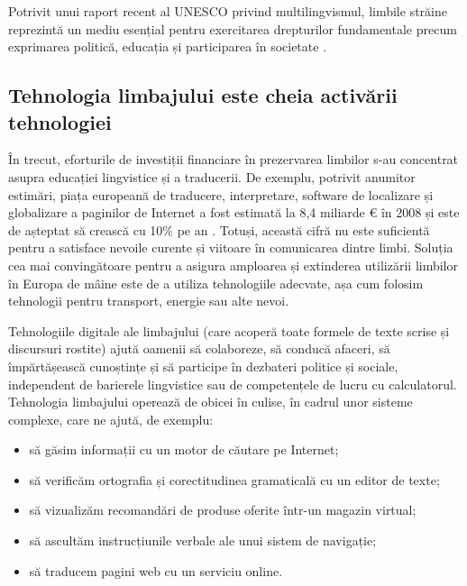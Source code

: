 \begin{multicols}{2}

Potrivit unui raport recent al UNESCO privind multilingvismul, limbile străine reprezintă un mediu esențial pentru exercitarea drepturilor fundamentale precum exprimarea politică, educația și participarea în societate \cite{Unesco1}.

\subsection{Tehnologia limbajului este cheia activării tehnologiei}

În trecut, eforturile de investiții financiare în prezervarea limbilor s-au concentrat asupra educației lingvistice și a traducerii. De exemplu, potrivit anumitor estimări, piața europeană de traducere, interpretare, software de localizare și globalizare a paginilor de Internet a fost estimată la 8,4 miliarde € în 2008 și este de așteptat să crească cu 10\% pe an \cite{EC3}. Totuși, această cifră nu este suficientă pentru a satisface nevoile curente și viitoare în comunicarea dintre limbi. Soluția cea mai convingătoare pentru a asigura amploarea și extinderea utilizării limbilor în Europa de mâine este de a utiliza tehnologiile adecvate, așa cum folosim tehnologii pentru transport, energie sau alte nevoi.

Tehnologiile digitale ale limbajului (care acoperă toate formele de texte scrise și discursuri rostite) ajută oamenii să colaboreze, să conducă afaceri, să împărtășească cunoștințe și să participe în dezbateri politice și sociale, independent de barierele lingvistice sau de competențele de lucru cu calculatorul. Tehnologia limbajului operează de obicei în culise, în cadrul unor sisteme complexe, care ne ajută, de exemplu:

\begin{itemize}
\item să găsim informații cu un motor de căutare pe Internet;
\item să verificăm ortografia și corectitudinea gramaticală cu un editor de texte;
\item să vizualizăm recomandări de produse oferite într-un magazin virtual;
\item să ascultăm instrucțiunile verbale ale unui sistem de navigație;
\item să traducem pagini web cu un serviciu online.
\end{itemize}


\end{multicols}
